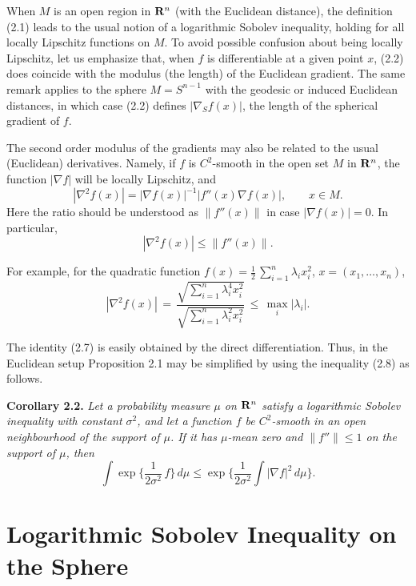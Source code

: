 \documentclass[reqno,12pt]{amsart}
\theoremstyle{plain}
\begin{document}
\vskip5mm
When $M$ is an open region in ${{\bf R}}^n$ (with the Euclidean distance), 
the definition (2.1) leads to the usual notion of a logarithmic Sobolev 
inequality, holding for all locally Lipschitz functions on $M$. 
To avoid possible confusion about being locally Lipschitz, let us
emphasize that, when $f$ is differentiable at a given point $x$, 
(2.2) does coincide with the modulus (the length) of the Euclidean gradient.
The same remark applies to the sphere $M = S^{n-1}$ with the geodesic or 
induced Euclidean distances, in which case (2.2) defines $|\nabla_S f(x)|$,
the length of the spherical gradient of $f$. 

The second order modulus of the gradients may also be related to the usual 
(Euclidean) derivatives. Namely, if $f$ is $C^2$-smooth in the open set 
$M$ in ${{\bf R}}^n$, the function $|\nabla f|$ will be locally Lipschitz, and 
\begin{equation}
|\nabla^2 f(x)| = |\nabla f(x)|^{-1} |f''(x)\nabla f(x)|, \qquad
x \in M.
\end{equation}
Here the ratio should be understood as $\|f''(x)\|$ in case 
$|\nabla f(x)| = 0$. In particular,
\begin{equation}
|\nabla^2 f(x)| \leq \|f''(x)\|.
\end{equation}

\vskip5mm
For example, for the quadratic function 
$f(x) = \frac{1}{2}\,\sum_{i=1}^n \lambda_i x_i^2$, $x = (x_1,\dots,x_n)$, 
$$
|\nabla^2 f(x)| \, = \, 
\frac{\sqrt{\sum_{i=1}^n \lambda_i^4 x_i^2}}{\sqrt{\sum_{i=1}^n 
\lambda_i^2 x_i^2}} \, \leq \, \max_i |\lambda_i|.
$$

The identity (2.7) is easily obtained by the direct differentiation.
Thus, in the Euclidean setup Proposition 2.1 may be simplified by using 
the inequality (2.8) as follows.

\vskip5mm
{\bf Corollary 2.2.} {\it Let a probability measure $\mu$ on ${{\bf R}}^n$
satisfy a logarithmic Sobolev inequality with constant $\sigma^2$,
and let a function $f$ be $C^2$-smooth in 
an open neighbourhood of the support of $\mu$. If it has $\mu$-mean zero 
and $\|f''\| \leq 1$ on the support of $\mu$, then
$$
\int \exp\Big\{\frac{1}{2\sigma^2}\, f\Big\}\,d\mu \leq \exp
\Big\{\frac{1}{2\sigma^2} \int |\nabla f|^2\,d\mu\Big\}.
$$
}

\vskip10mm
\section{{\bf Logarithmic Sobolev Inequality on the Sphere}}
\setcounter{equation}{0}
\end{document}
